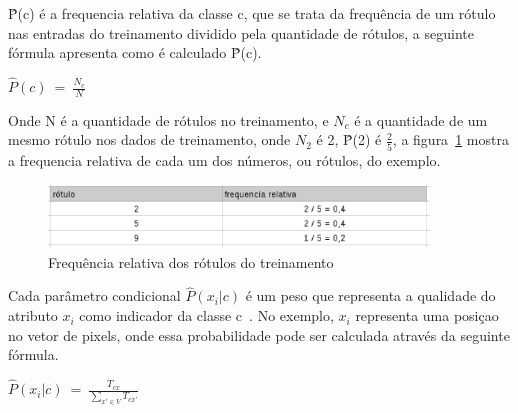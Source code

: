 {\^P}(c) é a frequencia relativa da classe c, que se trata da frequência de um rótulo
nas entradas do treinamento dividido pela quantidade de rótulos, a seguinte fórmula
apresenta como é calculado {\^P}(c).

\begin{center}

$ \hat{P}(c) \ = \ \frac{N_c}{N} $
\\
\end{center}

Onde N é a quantidade de rótulos no treinamento, e $N_c$ é a quantidade de um mesmo
rótulo nos dados de treinamento, onde $N_{2}$ é 2, {\^P}(2) é $\frac{2}{5}$, a
figura~\ref{fig:frequencia_relativa} mostra a frequencia relativa de  cada um dos
números, ou rótulos, do exemplo.

\begin{figure}[h]
  \centering
  \includegraphics[width=0.9\textwidth]{figuras/frequencia_relativa.eps}
  \caption{Frequência relativa dos rótulos do treinamento}
  \label{fig:frequencia_relativa}
\end{figure}

Cada parâmetro condicional $\hat{P}(x_i | c)$ é um peso que representa a qualidade
do atributo $x_i$ como indicador da classe c~\cite{araujo2011apprecommender}. No
exemplo, $x_i$ representa uma posiçao no vetor de pixels, onde essa probabilidade
pode ser calculada através da seguinte fórmula.

\begin{center}

$ \hat{P}(x_i | c) \ = \ \frac{T_{cx}}{\sum\limits_{x' \in V}T_{cx'}} $
\\
\end{center}

